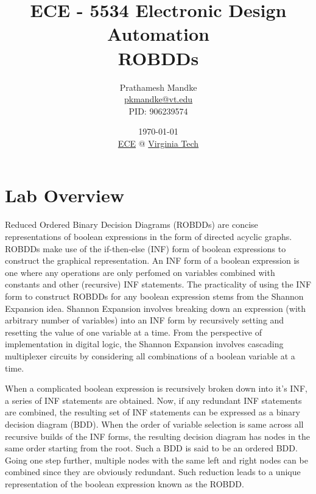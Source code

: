 \documentclass[a4paper, titlepage, 12pt]{article}
\numberwithin{equation}{section}
\begin{document}
    \title{ECE - 5534 Electronic Design Automation \\ ROBDDs}
    \author{Prathamesh Mandke \\ \href{pkmandke@vt.edu}{pkmandke@vt.edu} \\ PID: 906239574}
    \date{\today \\ \href{https://ece.vt.edu}{ECE} @ \href{https://vt.edu}{Virginia Tech}}
    \maketitle
    \newpage

    \section{Lab Overview}

        Reduced Ordered Binary Decision Diagrams (ROBDDs) are concise representations of boolean expressions in the form of directed acyclic graphs.
        ROBDDs make use of the if-then-else (INF) form of boolean expressions to construct the graphical representation.
        An INF form of a boolean expression is one where any operations are only perfomed on variables combined with constants and other (recursive) INF statements.
        The practicality of using the INF form to construct ROBDDs for any boolean expression stems from the Shannon Expansion idea.
        Shannon Expansion involves breaking down an expression (with arbitrary number of variables) into an INF form by recursively setting and resetting the value of one variable at a time.
        From the perspective of implementation in digital logic, the Shannon Expansion involves cascading multiplexer circuits by considering all combinations of a boolean variable at a time.
        
        When a complicated boolean expression is recursively broken down into it's INF, a series of INF statements are obtained.
        Now, if any redundant INF statements are combined, the resulting set of INF statements can be expressed as a binary decision diagram (BDD).
        When the order of variable selection is same across all recursive builds of the INF forms, the resulting decision diagram has nodes in the same order starting from the root.
        Such a BDD is said to be an ordered BDD.
        Going one step further, multiple nodes with the same left and right nodes can be combined since they are obviously redundant.
        Such reduction leads to a unique representation of the boolean expression known as the ROBDD.
\end{document}
